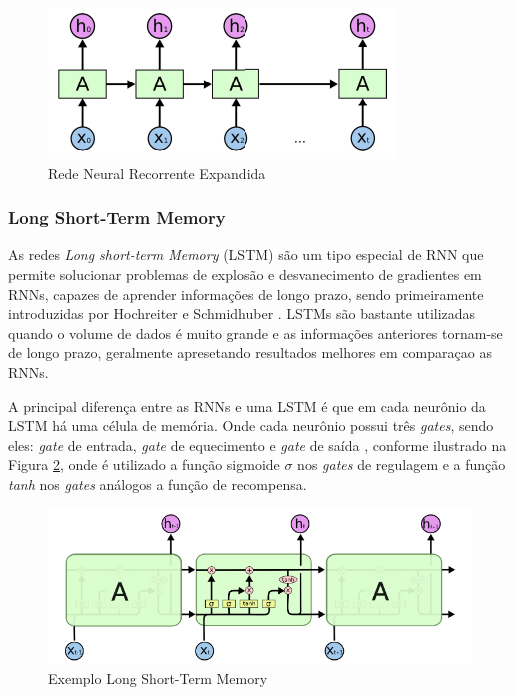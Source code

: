 \begin{figure}[!h]
	\centering
	\label{fig_rnn2}
		\includegraphics[keepaspectratio=true,scale=0.5]{figuras/Exemplo_Rnn_expandido.png}
	\caption{Rede Neural Recorrente Expandida \cite{rnn3}}
\end{figure}

\subsubsection{Long Short-Term Memory}

As redes \emph{Long short-term Memory} (LSTM) são um tipo especial de RNN que permite solucionar problemas de explosão e desvanecimento de gradientes em RNNs, capazes de aprender informações de longo prazo, sendo primeiramente introduzidas por Hochreiter e Schmidhuber \cite{lstm1}. LSTMs são bastante utilizadas quando o volume de dados é muito grande e as informações anteriores tornam-se de longo prazo, geralmente apresetando resultados melhores em comparaçao as RNNs.

A principal diferença entre as RNNs e uma LSTM é que em cada neurônio da LSTM há uma célula de memória. Onde cada neurônio possui três \emph{gates}, sendo eles: \emph{gate} de entrada, \emph{gate} de equecimento e \emph{gate} de saída \cite{rna3}, conforme ilustrado na Figura \ref{fig_lstm1}, onde é utilizado a função sigmoide {$\sigma$} nos \emph{gates} de regulagem e a função \emph{tanh} nos \emph{gates} análogos a função de recompensa.

\begin{figure}[!h]
	\centering
	\label{fig_lstm1}
		\includegraphics[keepaspectratio=true,scale=0.5]{figuras/lstm.png}
	\caption{Exemplo Long Short-Term Memory \cite{rnn3}}
\end{figure}

